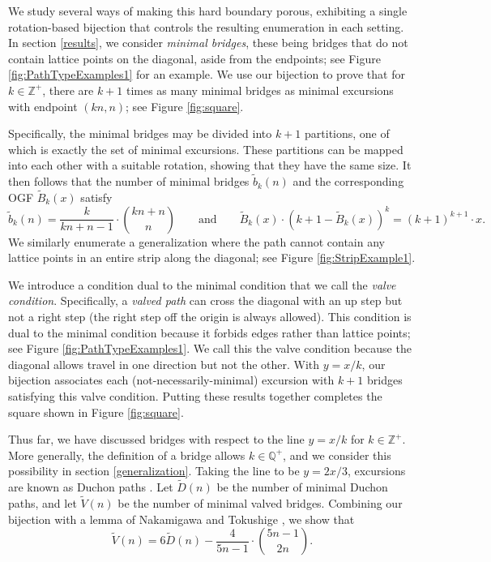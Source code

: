 \documentclass[10pt]{article}
\newcommand{\eqn}[1]{\begin{equation*} #1 \end{equation*}}
\newcommand{\qquadtext}[1]{\qquad \text{#1} \qquad}
\begin{document}
We study several ways of making this hard boundary porous, exhibiting a single rotation-based bijection that controls the resulting enumeration in each setting.
In section \ref{results}, we consider \textit{minimal bridges}, these being bridges that do not contain lattice points on the diagonal, aside from the endpoints; see Figure \ref{fig:PathTypeExamples1} for an example. We use our bijection to prove that for $k\in \mathbb{Z}^+$, there are $k+1$ times as many minimal bridges as minimal excursions with endpoint $(kn,n)$; see Figure \ref{fig:square}. 

Specifically, the minimal bridges may be divided into $k+1$ partitions, one of which is exactly the set of minimal excursions. These partitions can be mapped into each other with a suitable rotation, showing that they have the same size. It then follows that the number of minimal bridges $\widetilde{b}_k(n)$ and the corresponding OGF $\widetilde{B}_k(x)$ satisfy
\eqn{\widetilde{b}_k(n)=\frac{k}{kn+n-1}\cdot\binom{kn+n}{n} \qquadtext{and} \widetilde{B}_k(x) \cdot (k + 1 - \widetilde{B}_k(x))^k = (k+1)^{k+1} \cdot x.}
We similarly enumerate a generalization where the path cannot contain any lattice points in an entire strip along the diagonal; see Figure \ref{fig:StripExample1}.

We introduce a condition dual to the minimal condition that we call the \emph{valve condition}. Specifically, a \textit{valved path} can cross the diagonal with an up step but not a right step (the right step off the origin is always allowed). This condition is dual to the minimal condition because it forbids edges rather than lattice points; see Figure \ref{fig:PathTypeExamples1}. We call this the valve condition because the diagonal allows travel in one direction but not the other. With $y=x/k$, our bijection associates each (not-necessarily-minimal) excursion with $k+1$ bridges satisfying this valve condition. Putting these results together completes the square shown in Figure \ref{fig:square}.

Thus far, we have discussed bridges with respect to the line $y=x/k$ for $k\in \mathbb{Z}^+$. More generally, the definition of a bridge allows $k\in \mathbb{Q}^+$, and we consider this possibility in section \ref{generalization}.  Taking the line to be $y=2x/3$, excursions are known as Duchon paths \cite[Example 5]{banderier2002}.  Let $\widetilde{D}(n)$ be the number of minimal Duchon paths, and let $\widetilde{V}(n)$ be the number of minimal valved bridges. Combining our bijection with a
lemma of Nakamigawa and Tokushige \cite[Thm.~1.1]{NakamigawaTokushige2011}, we show that
\eqn{\widetilde{V}(n)=6\widetilde{D}(n) - \frac{4}{5n-1}\cdot\binom{5n-1}{2n}.}
\end{document}
